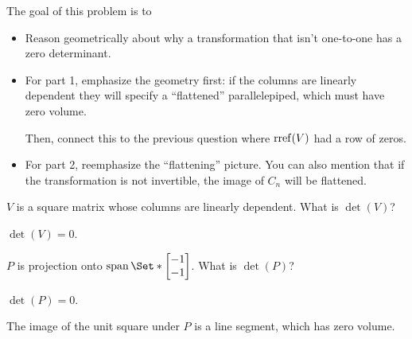 	\bookonlynewpage
	\question
	\begin{annotation}
		\begin{goals}

			The goal of this problem is to
			\begin{itemize}
				\item Reason geometrically about why a transformation that isn't one-to-one
					has a zero determinant.
			\end{itemize}
		\end{goals}

		\begin{notes}
			\begin{itemize}
				\item For part 1, emphasize the geometry first: if 
					the columns are linearly dependent they will
					specify a ``flattened'' parallelepiped, which must have zero volume.

					Then, connect this to the previous question where $\operatorname{rref}(V)$ had a row of zeros.
				\item For part 2, reemphasize the ``flattening'' picture. You can also mention
					that if the transformation is not invertible, the image of $C_n$ will
					be flattened.
			\end{itemize}
		\end{notes}
	\end{annotation}
	\begin{parts}
		\item $V$ is a square matrix whose columns are linearly dependent.
			What is $\det(V)$?
			\begin{solution}
				$\det(V)=0$.
			\end{solution}
		\item $P$ is projection onto $\Span\Set*{\mat{-1\\-1}}$. What is $\det(P)$?
			\begin{solution}
				$\det(P)=0$.

				The image of the unit square under $P$ is a line segment, which
				has zero volume.
			\end{solution}
	\end{parts}

